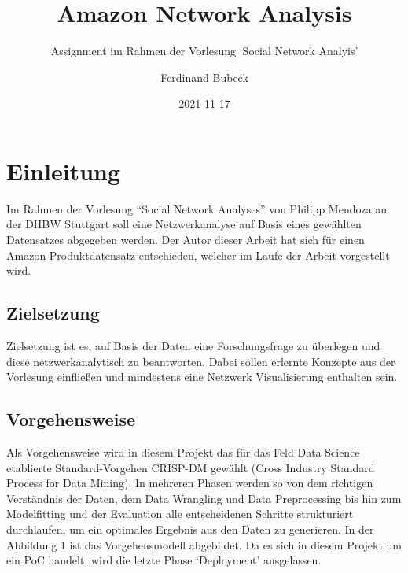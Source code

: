 \documentclass[
  12 pt,
]{article}
\title{Amazon Network Analysis}
\subtitle{Assignment im Rahmen der Vorlesung `Social Network Analyis'}
\author{Ferdinand Bubeck}
\date{2021-11-17}
\begin{document}
\maketitle

\renewcommand*\contentsname{Inhaltsverzeichnis}
{
\setcounter{tocdepth}{3}
\tableofcontents
}
\newpage

\hypertarget{einleitung}{%
\section{Einleitung}\label{einleitung}}

Im Rahmen der Vorlesung ``Social Network Analyses'' von Philipp Mendoza
an der DHBW Stuttgart soll eine Netzwerkanalyse auf Basis eines
gewählten Datensatzes abgegeben werden. Der Autor dieser Arbeit hat sich
für einen Amazon Produktdatensatz entschieden, welcher im Laufe der
Arbeit vorgestellt wird.

\hypertarget{zielsetzung}{%
\subsection{Zielsetzung}\label{zielsetzung}}

Zielsetzung ist es, auf Basis der Daten eine Forschungsfrage zu
überlegen und diese netzwerkanalytisch zu beantworten. Dabei sollen
erlernte Konzepte aus der Vorlesung einfließen und mindestens eine
Netzwerk Visualisierung enthalten sein.

\hypertarget{vorgehensweise}{%
\subsection{Vorgehensweise}\label{vorgehensweise}}

Als Vorgehensweise wird in diesem Projekt das für das Feld Data Science
etablierte Standard-Vorgehen CRISP-DM gewählt (Cross Industry Standard
Process for Data Mining). In mehreren Phasen werden so von dem richtigen
Verständnis der Daten, dem Data Wrangling und Data Preprocessing bis hin
zum Modelfitting und der Evaluation alle entscheidenen Schritte
strukturiert durchlaufen, um ein optimales Ergebnis aus den Daten zu
generieren. In der Abbildung 1 ist das Vorgehensmodell abgebildet. Da es
sich in diesem Projekt um ein PoC handelt, wird die letzte Phase
`Deployment' ausgelassen.
\end{document}

